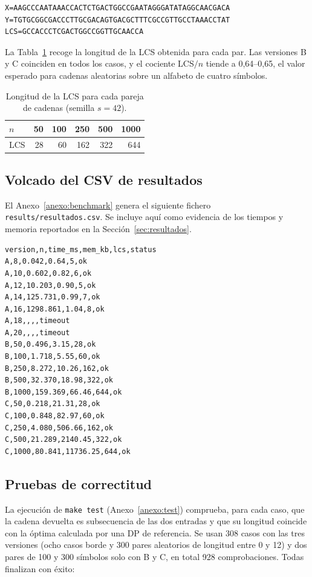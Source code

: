 \documentclass[11pt,a4paper]{article}
\begin{document}
\begin{lstlisting}[style=txt, caption={\texttt{results/datos/n50.txt}}]
X=AAGCCCAATAAACCACTCTGACTGGCCGAATAGGGATATAGGCAACGACA
Y=TGTGCGGCGACCCTTGCGACAGTGACGCTTTCGCCGTTGCCTAAACCTAT
LCS=GCCACCCTCGACTGGCCGGTTGCAACCA
\end{lstlisting}
La Tabla~\ref{tab:lcs-valores} recoge la longitud de la LCS obtenida
para cada par. Las versiones B y C coinciden en todos los casos, y el
cociente LCS$/n$ tiende a 0,64--0,65, el valor esperado para cadenas
aleatorias sobre un alfabeto de cuatro símbolos.

\begin{table}[h]
\centering
\begin{tabular}{@{}lrrrrr@{}}
\toprule
$n$ & 50 & 100 & 250 & 500 & 1000 \\
\midrule
LCS & 28 & 60 & 162 & 322 & 644 \\
\bottomrule
\end{tabular}
\caption{Longitud de la LCS para cada pareja de cadenas (semilla
$s=42$).}\label{tab:lcs-valores}
\end{table}

\subsection{Volcado del CSV de resultados}

El Anexo~\ref{anexo:benchmark} genera el siguiente fichero
\texttt{results/resultados.csv}. Se incluye aquí como evidencia de los
tiempos y memoria reportados en la Sección~\ref{sec:resultados}.

\begin{lstlisting}[style=txt, caption={\texttt{results/resultados.csv}}]
version,n,time_ms,mem_kb,lcs,status
A,8,0.042,0.64,5,ok
A,10,0.602,0.82,6,ok
A,12,10.203,0.90,5,ok
A,14,125.731,0.99,7,ok
A,16,1298.861,1.04,8,ok
A,18,,,,timeout
A,20,,,,timeout
B,50,0.496,3.15,28,ok
B,100,1.718,5.55,60,ok
B,250,8.272,10.26,162,ok
B,500,32.370,18.98,322,ok
B,1000,159.369,66.46,644,ok
C,50,0.218,21.31,28,ok
C,100,0.848,82.97,60,ok
C,250,4.080,506.66,162,ok
C,500,21.289,2140.45,322,ok
C,1000,80.841,11736.25,644,ok
\end{lstlisting}

\subsection{Pruebas de correctitud}

La ejecución de \texttt{make test} (Anexo~\ref{anexo:test}) comprueba,
para cada caso, que la cadena devuelta es subsecuencia de las dos
entradas y que su longitud coincide con la óptima calculada por una DP
de referencia. Se usan 308 casos con las tres versiones (ocho casos
borde y 300 pares aleatorios de longitud entre 0 y 12) y dos pares de
100 y 300 símbolos solo con B y C, en total 928 comprobaciones. Todas
finalizan con éxito:
\end{document}

